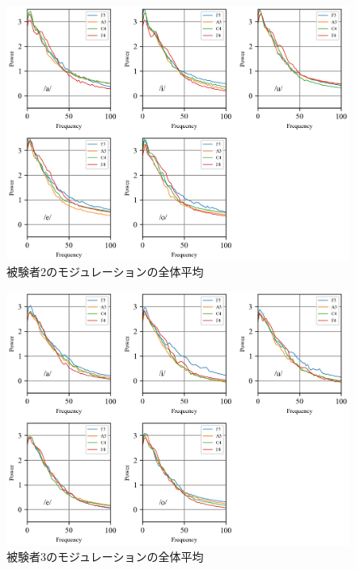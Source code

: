 \documentclass[10.5ptj,a4j,dvipdfmx,uplatex, oneside, openany, report]{jsbook}%
\begin{document}
\begin{figure}[htbp]
    \begin{center}
      \includegraphics[clip,width=12.0cm]{long_spectrogram_2.png}
      \caption{被験者2のモジュレーションの全体平均}
      \label{long_spectrogram_2}
    \end{center}
\end{figure}

\begin{figure}[htbp]
    \begin{center}
      \includegraphics[clip,width=12.0cm]{long_spectrogram_3.png}
      \caption{被験者3のモジュレーションの全体平均}
      \label{long_spectrogram_3}
    \end{center}
\end{figure}
\end{document}
